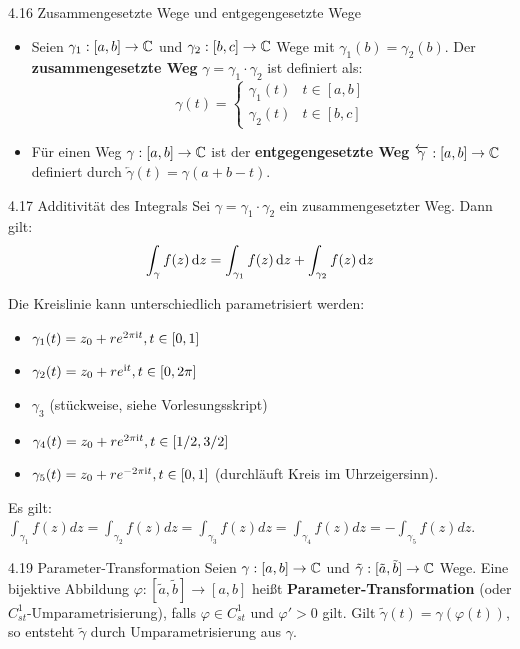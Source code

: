 \begin{defi}{4.16 Zusammengesetzte Wege und entgegengesetzte Wege}
\begin{itemize}
    \item[i)] Seien $\gamma_1: [a,b] \to \mathbb{C}$ und $\gamma_2: [b,c] \to \mathbb{C}$ Wege mit $\gamma_1(b) = \gamma_2(b)$. Der \textbf{zusammengesetzte Weg} $\gamma = \gamma_1 \cdot \gamma_2$ ist definiert als:
    \[
    \gamma(t) = \begin{cases} \gamma_1(t) & t \in [a,b] \\ \gamma_2(t) & t \in [b,c] \end{cases}
    \]
    \item[ii)] Für einen Weg $\gamma: [a,b] \to \mathbb{C}$ ist der \textbf{entgegengesetzte Weg} $\overleftarrow{\gamma}: [a,b] \to \mathbb{C}$ definiert durch $\overleftarrow{\gamma}(t) = \gamma(a+b-t)$.
\end{itemize}
\end{defi}

\begin{satz}{4.17 Additivität des Integrals}
Sei $\gamma = \gamma_1 \cdot \gamma_2$ ein zusammengesetzter Weg. Dann gilt:
\[
    \int_\gamma f(z) \, \mathrm{d}z = \int_{\gamma_1} f(z) \, \mathrm{d}z + \int_{\gamma_2} f(z) \, \mathrm{d}z
\]
\end{satz}

\begin{tcolorbox}[colback=white, colframe=black!70, title={Bsp 4.18: Parametrisierung der Kreislinie $\partial B_r(z_0)$}]
Die Kreislinie kann unterschiedlich parametrisiert werden:
\begin{itemize}
    \item[i)] $\gamma_1(t) = z_0 + re^{2\pi\mathrm{i} t}, t \in [0,1]$
    \item[ii)] $\gamma_2(t) = z_0 + re^{\mathrm{i} t}, t \in [0,2\pi]$
    \item[iii)] $\gamma_3$ (stückweise, siehe Vorlesungsskript)
    \item[iv)] $\gamma_4(t) = z_0 + re^{2\pi\mathrm{i} t}, t \in[1/2, 3/2]$
    \item[v)] $\gamma_5(t) = z_0 + re^{-2\pi\mathrm{i} t}, t \in [0,1]$ (durchläuft Kreis im Uhrzeigersinn).
\end{itemize}
Es gilt: $\int_{\gamma_1} f(z) dz = \int_{\gamma_2} f(z) dz = \int_{\gamma_3} f(z) dz = \int_{\gamma_4} f(z) dz = -\int_{\gamma_5} f(z) dz$.
\end{tcolorbox}

\begin{defi}{4.19 Parameter-Transformation}
Seien $\gamma: [a,b] \to \mathbb{C}$ und $\tilde{\gamma}: [\tilde{a},\tilde{b}] \to \mathbb{C}$ Wege. Eine bijektive Abbildung $\varphi: [\tilde{a},\tilde{b}] \to [a,b]$ heißt \textbf{Parameter-Transformation} (oder $C_{st}^1$-Umparametrisierung), falls $\varphi \in C_{st}^1$ und $\varphi' > 0$ gilt. 
Gilt $\tilde{\gamma}(t) = \gamma(\varphi(t))$, so entsteht $\tilde{\gamma}$ durch Umparametrisierung aus $\gamma$.
\end{defi}

